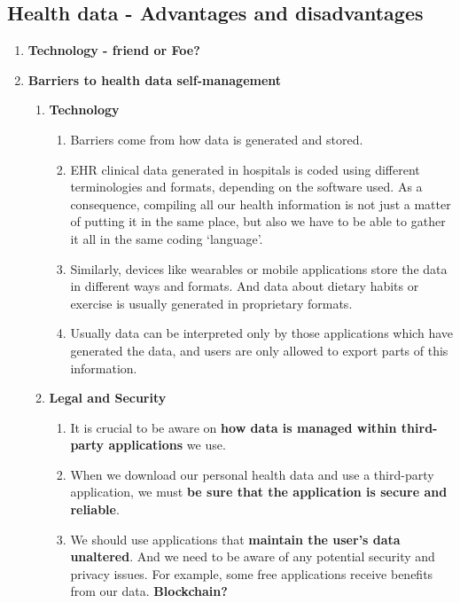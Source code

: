 \documentclass[10pt, twoside]{article}   	%
\begin{document}
\subsection{Health data - Advantages and disadvantages}
\begin{enumerate}
\item \textbf{Technology - friend or Foe?}
\item \textbf{Barriers to health data self-management}
    \begin{enumerate}
        \item \textbf{Technology}
            \begin{enumerate}
                \item Barriers come from how data is generated and stored.
                \item EHR clinical data generated in hospitals is coded using different terminologies and formats, depending on the software used. As a consequence, compiling all our health information is not just a matter of putting it in the same place, but also we have to be able to gather it all in the same coding ‘language’.
                \item Similarly, devices like wearables or mobile applications store the data in different ways and formats. And data about dietary habits or exercise is usually generated in proprietary formats.
                \item Usually data can be interpreted only by those applications which have generated the data, and users are only allowed to export parts of this information.
            \end{enumerate}
        \item \textbf{Legal and Security}
            \begin{enumerate}
                \item It is crucial to be aware on \textbf{how data is managed within third-party applications} we use.
                \item When we download our personal health data and use a third-party application, we must \textbf{be sure that the application is secure and reliable}.
                \item We should use applications that \textbf{maintain the user’s data unaltered}. And we need to be aware of any potential security and privacy issues. For example, some free applications receive benefits from our data. \textbf{Blockchain?}

\end{enumerate}
\end{enumerate}
\end{enumerate}
\end{document}
